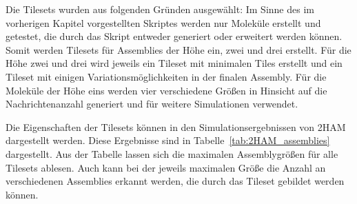 Die Tilesets wurden aus folgenden Gründen ausgewählt: Im Sinne des im vorherigen Kapitel vorgestellten Skriptes werden nur Moleküle erstellt und getestet, die durch das Skript entweder generiert oder erweitert werden können. Somit werden Tilesets für Assemblies der Höhe ein, zwei und drei erstellt. Für die Höhe zwei und drei wird jeweils ein Tileset mit minimalen Tiles erstellt und ein Tileset mit einigen Variationsmöglichkeiten in der finalen Assembly. Für die Moleküle der Höhe eins werden vier verschiedene Größen in Hinsicht auf die Nachrichtenanzahl generiert und für weitere Simulationen verwendet. 

Die Eigenschaften der Tilesets können in den Simulationsergebnissen von 2HAM dargestellt werden. Diese Ergebnisse sind in Tabelle~\ref{tab:2HAM_assemblies} dargestellt. Aus der Tabelle lassen sich die maximalen Assemblygrößen für alle Tilesets ablesen. Auch kann bei der jeweils maximalen Größe die Anzahl an verschiedenen Assemblies erkannt werden, die durch das Tileset gebildet werden können.

